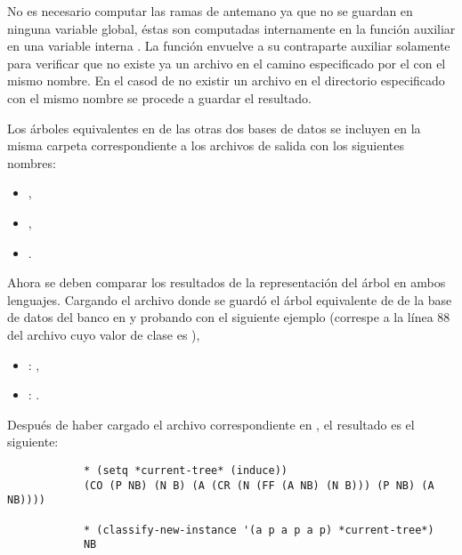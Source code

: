 \begin{itemize}
\begin{solution}
        No es necesario computar las ramas de antemano ya que no se guardan en ninguna variable global, éstas son computadas internamente en la función auxiliar  en una variable interna . La función  envuelve a su contraparte auxiliar solamente para verificar que no existe ya un archivo en el camino especificado por el  con el mismo nombre. En el casod de no existir un archivo en el directorio especificado con el mismo nombre se procede a guardar el resultado. 
    
        Los árboles equivalentes en  de las otras dos bases de datos se incluyen en la misma carpeta correspondiente a los archivos de salida con los siguientes nombres:
        \begin{itemize}
            \item {},
            \item {},
            \item {}.
        \end{itemize}

        Ahora se deben comparar los resultados de la representación del árbol en ambos lenguajes. Cargando el archivo donde se guardó el árbol equivalente de  de la base de datos del banco en  y probando con el siguiente ejemplo (correspe a la línea 88 del archivo  cuyo valor de clase es ),
        \begin{itemize}
            \item {}: ,
            \item {}: \code{[ir/a, mr/p, ff/a, cr/p, co/a, op/p]}.
        \end{itemize}
        Después de haber cargado el archivo correspondiente en , el resultado es el siguiente:
        \begin{verbatim}
            * (setq *current-tree* (induce))
            (CO (P NB) (N B) (A (CR (N (FF (A NB) (N B))) (P NB) (A NB))))

            * (classify-new-instance '(a p a p a p) *current-tree*)
            NB
        \end{verbatim}
        

\end{solution}
\end{itemize}
